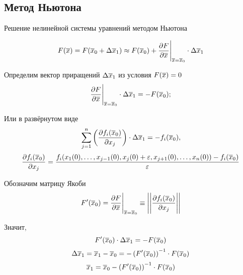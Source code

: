 
\subsection{Метод Ньютона}

Решение нелинейной системы уравнений методом Ньютона

\[
F(\overline{x}) = F(\overline{x}_0 + \Delta \overline{x}_1) \approx  F(\overline{x}_0) + \frac{\partial F}{\partial \overline{x}}\Bigg|_{\overline{x} = \overline{x}_0} \cdot \Delta \overline{x}_1
\]

Определим вектор приращений $\Delta \overline{x}_1$ из условия $F(\overline{x}) = 0$
\[
\frac{\partial F}{\partial \overline{x}}\Bigg|_{\overline{x} = \overline{x}_0} \cdot \Delta \overline{x}_1 =  -  F(\overline{x}_0);
\] 

Или в развёрнутом виде
\[
\sum\limits_{j=1}^{n} \left( \frac{\partial f_i(\overline{x}_0)}{\partial x_j } \right) \cdot \Delta \overline{x}_1 = -  f_i(\overline{x}_0),
\]\[
\frac{\partial f_i(\overline{x}_0)}{\partial x_j }  = \frac{f_i(x_1(0), \dots, x_{j-1}(0), x_j(0) + \varepsilon, x_{j+1}(0), \dots, x_n(0)) - f_i(\overline{x}_0)}{\varepsilon}
\]

Обозначим матрицу Якоби
\[
F'(\overline{x}_0) = \frac{\partial F}{\partial \overline{x}}\Bigg|_{\overline{x} = \overline{x}_0} \equiv \Bigg|\Bigg|\frac{\partial f_i(\overline{x}_0)}{\partial x_j } \Bigg|\Bigg| 
\]

Значит,
\[
F'(\overline{x}_0) \cdot \Delta \overline{x}_1 = -  F(\overline{x}_0) 
\]
\[
\Delta \overline{x}_1 = \overline{x}_1 - \overline{x}_0 = -  \left( F'(\overline{x}_0) \right)^{-1} \cdot F(\overline{x}_0) 
\]
\[
\overline{x}_1  = \overline{x}_0 -  \left( F'(\overline{x}_0) \right)^{-1} \cdot F(\overline{x}_0) 
\]

